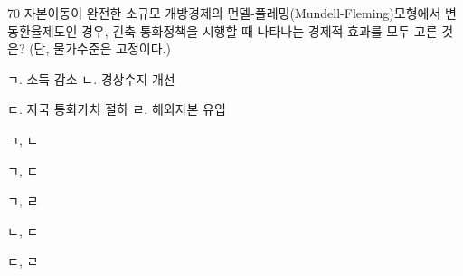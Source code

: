 \begin{question}{70}
자본이동이 완전한 소규모 개방경제의 먼델-플레밍(Mundell-Fleming)모형에서 변동환율제도인 경우, 긴축 통화정책을 시행할 때 나타나는 경제적 효과를 모두 고른 것은? (단, 물가수준은 고정이다.)
\begin{framedtext}
ㄱ. 소득 감소 \hfill ㄴ. 경상수지 개선 \hspace{6em} \par
ㄷ. 자국 통화가치 절하 \hfill ㄹ. 해외자본 유입 \hspace{6em}
\end{framedtext}
\begin{choices}
  \item ㄱ, ㄴ
  \item ㄱ, ㄷ
  \item ㄱ, ㄹ
  \item ㄴ, ㄷ
  \item ㄷ, ㄹ
\end{choices}
\end{question}
